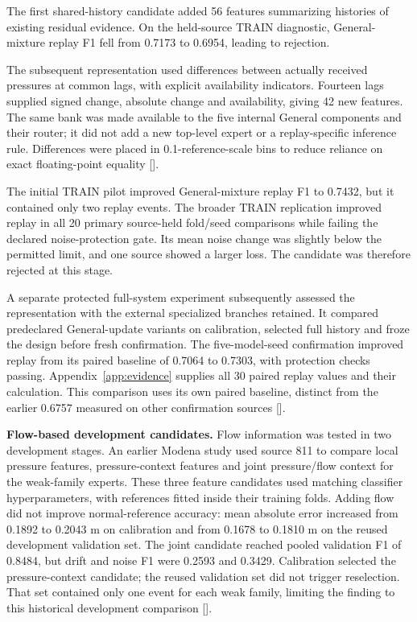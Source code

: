 The first shared-history candidate added 56 features summarizing histories of existing residual evidence. On the held-source TRAIN diagnostic, General-mixture replay F1 fell from 0.7173 to 0.6954, leading to rejection.

The subsequent representation used differences between actually received pressures at common lags, with explicit availability indicators. Fourteen lags supplied signed change, absolute change and availability, giving 42 new features. The same bank was made available to the five internal General components and their router; it did not add a new top-level expert or a replay-specific inference rule. Differences were placed in 0.1-reference-scale bins to reduce reliance on exact floating-point equality [].

The initial TRAIN pilot improved General-mixture replay F1 to 0.7432, but it contained only two replay events. The broader TRAIN replication improved replay in all 20 primary source-held fold/seed comparisons while failing the declared noise-protection gate. Its mean noise change was slightly below the permitted limit, and one source showed a larger loss. The candidate was therefore rejected at this stage.

A separate protected full-system experiment subsequently assessed the representation with the external specialized branches retained. It compared predeclared General-update variants on calibration, selected full history and froze the design before fresh confirmation. The five-model-seed confirmation improved replay from its paired baseline of 0.7064 to 0.7303, with protection checks passing. Appendix~\ref{app:evidence} supplies all 30 paired replay values and their calculation. This comparison uses its own paired baseline, distinct from the earlier 0.6757 measured on other confirmation sources [].

\noindent\textbf{Flow-based development candidates.}
Flow information was tested in two development stages. An earlier Modena study used source 811 to compare local pressure features, pressure-context features and joint pressure/flow context for the weak-family experts. These three feature candidates used matching classifier hyperparameters, with references fitted inside their training folds. Adding flow did not improve normal-reference accuracy: mean absolute error increased from 0.1892 to 0.2043 m on calibration and from 0.1678 to 0.1810 m on the reused development validation set. The joint candidate reached pooled validation F1 of 0.8484, but drift and noise F1 were 0.2593 and 0.3429. Calibration selected the pressure-context candidate; the reused validation set did not trigger reselection. That set contained only one event for each weak family, limiting the finding to this historical development comparison [].

